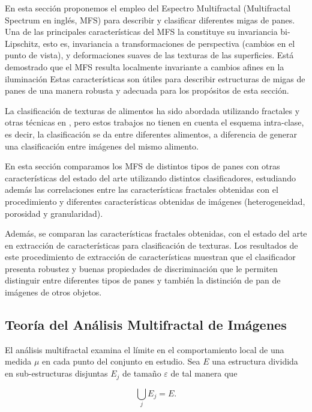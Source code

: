 En esta sección proponemos el empleo del Espectro Multifractal (Multifractal Spectrum en inglés, \acrshort{MFS}) para describir y clasificar diferentes migas de panes.
Una de las principales características del MFS la constituye su invariancia bi-Lipschitz, esto es, invariancia a transformaciones de perspectiva (cambios en el punto de vista), y deformaciones suaves de las texturas de las superficies.
Está demostrado que el MFS resulta localmente invariante a cambios afines en la iluminación
Estas características son útiles para describir estructuras de migas de panes de una manera robusta y adecuada para los propósitos de esta sección.

La clasificación de texturas de alimentos ha sido abordada utilizando fractales y otras técnicas en \cite{Zong2010,Bosch2011}, pero estos trabajos no tienen en cuenta el esquema intra-clase, es decir, la clasificación se da entre diferentes alimentos, a diferencia de generar una clasificación entre imágenes del mismo alimento.


En esta sección comparamos los MFS de distintos tipos de panes con otras características del estado del arte utilizando distintos clasificadores, estudiando además las correlaciones entre las características fractales obtenidas con el procedimiento y diferentes características obtenidas de imágenes (heterogeneidad, porosidad y granularidad).

Además, se comparan las características fractales obtenidas, con el estado del arte en extracción de características para clasificación de texturas.
Los resultados de este procedimiento de extracción de características muestran que el clasificador presenta robustez y buenas propiedades de discriminación que le permiten distinguir entre diferentes tipos de panes y también la distinción de pan de imágenes de otros objetos.

\subsection{Teoría del Análisis Multifractal de Imágenes}

El análisis multifractal examina el límite en el comportamiento local de una medida $\mu$ en cada punto del conjunto en estudio.
Sea $E$ una estructura dividida en sub-estructuras disjuntas $E_{j}$ de tamaño $\varepsilon$ de tal manera que

\begin{equation}
\displaystyle\bigcup_{j}E_{j} = E.
\end{equation}

